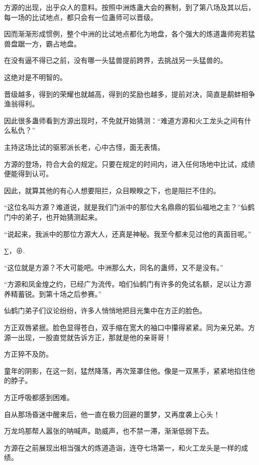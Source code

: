 
\begin{this_body}

方源的出现，出乎众人的意料。按照中洲炼蛊大会的赛制，到了第八场及其以后，每一场的比试地点，都只会有一位蛊师可以晋级。

因而渐渐形成惯例，整个中洲的比试地点都化为地盘，各个强大的炼道蛊师宛若猛兽盘踞一方，霸占地盘。

在没有逼不得已之前，没有哪一头猛兽提前跨界，去挑战另一头猛兽的。

这绝对是不明智的。

晋级越多，得到的荣耀也就越高，得到的奖励也越多，提前对决，简直是鹬蚌相争渔翁得利。

因此很多蛊师看到方源出现时，不免就开始猜测：“难道方源和火工龙头之间有什么私仇？”

主持这场比试的驱邪派长老，心中古怪，面无表情。

方源的登场，符合大会的规定。只要在规定的时间内，进入任何场地中比试，成绩便能得到认可。

因此，就算其他的有心人想要阻拦，众目睽睽之下，也是阻拦不住的。

“这位名叫方源？难道说，就是我们门派中的那位大名鼎鼎的狐仙福地之主？”仙鹤门中的弟子，也开始猜测起来。

“说起来，我派中的那位方源大人，还真是神秘。我至今都未见过他的真面目呢。”

∑，⊕.

“这位就是方源？不大可能吧。中洲那么大，同名的蛊师，又不是没有。”

“方源和凤金煌之约，已经广为流传。咱们仙鹤门有许多的免试名额，足以让方源养精蓄锐。到第十场之后参赛。”

仙鹤门弟子们议论纷纷，许多人悄悄地把目光集中在方正的脸色。

方正双唇紧抿。脸色显得苍白，双手缩在宽大的袖口中攥得紧紧。同为亲兄弟。方源一出现，一股直觉就告诉方正，那就是他的亲哥哥！

方正猝不及防。

童年的阴影，在这一刻，猛然降落，再次笼罩住他。像是一双黑手，紧紧地掐住他的脖子。

方正呼吸都感到困难。

自从那场昏迷中醒来后，他一直在极力回避的噩梦，又再度袭上心头！

万龙坞那帮人嚣张的呐喊声。助威声，也不禁一滞，渐渐低弱下去。

方源在之前展现出相当强大的炼道造诣，连夺七场第一，和火工龙头是一样的成绩。


\end{this_body}
